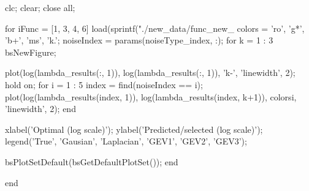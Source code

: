 clc;
clear;
close all;




for iFunc = [1, 3, 4, 6]
    load(sprintf("./new_data/func_new_%
    colors = {'ro', 'g*', 'b+', 'ms', 'k.'};
    noiseIndex = params(noiseType_index, :);
    for k = 1 : 3
        bsNewFigure;
    
    
        plot(log(lambda_results(:, 1)), log(lambda_results(:, 1)), 'k-', 'linewidth', 2); hold on;
        for i = 1 : 5
            index = find(noiseIndex == i);
            plot(log(lambda_results(index, 1)), log(lambda_results(index, k+1)), colors{i}, 'linewidth', 2); 
        end
        
        xlabel('Optimal \lambda (log scale)');
        ylabel('Predicted/selected \lambda (log scale)');
        legend('True', 'Gausian', 'Laplacian', 'GEV1', 'GEV2', 'GEV3');
        
        bsPlotSetDefault(bsGetDefaultPlotSet());
    end
    
    
end